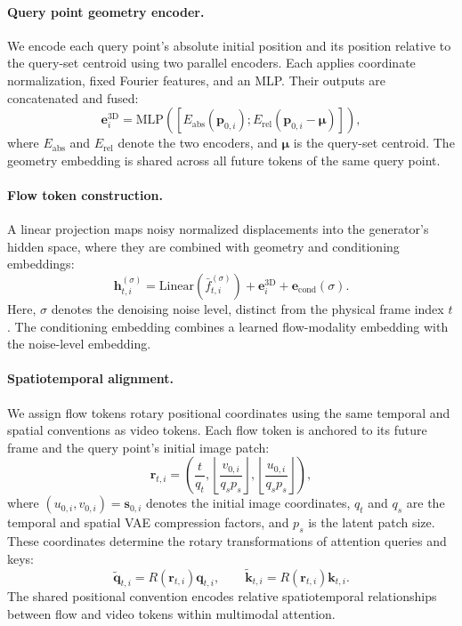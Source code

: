 \paragraph{Query point geometry encoder.}
We encode each query point's absolute initial position
and its position relative to the query-set centroid
using two parallel encoders.
Each applies coordinate normalization, fixed Fourier
features, and an MLP.
Their outputs are concatenated and fused:
\begin{equation}
\mathbf{e}^{\mathrm{3D}}_i
=
\mathrm{MLP}
\left(
\left[
E_{\mathrm{abs}}(\mathbf{p}_{0,i});
E_{\mathrm{rel}}(\mathbf{p}_{0,i}-\boldsymbol{\mu})
\right]
\right),
\label{eq:point-pe}
\end{equation}
where $E_{\mathrm{abs}}$ and $E_{\mathrm{rel}}$ denote
the two encoders, and $\boldsymbol{\mu}$ is the query-set
centroid.
The geometry embedding is shared across all future
tokens of the same query point.

\paragraph{Flow token construction.}
A linear projection maps noisy normalized displacements
into the generator's hidden space, where they are combined
with geometry and conditioning embeddings:
\begin{equation}
\mathbf{h}_{t,i}^{(\sigma)}
=
\mathrm{Linear}(\bar{f}_{t,i}^{(\sigma)})
+
\mathbf{e}^{\mathrm{3D}}_i
+
\mathbf{e}_{\mathrm{cond}}(\sigma).
\label{eq:flow-embedding}
\end{equation}
Here, $\sigma$ denotes the denoising noise level,
distinct from the physical frame index $t$.
The conditioning embedding combines a learned
flow-modality embedding with the noise-level embedding.

\paragraph{Spatiotemporal alignment.}
We assign flow tokens rotary positional coordinates
using the same temporal and spatial conventions as
video tokens.
Each flow token is anchored to its future frame
and the query point's initial image patch:
\begin{equation}
\mathbf{r}_{t,i}
=
\left(
\frac{t}{q_t},
\left\lfloor\frac{v_{0,i}}{q_s p_s}\right\rfloor,
\left\lfloor\frac{u_{0,i}}{q_s p_s}\right\rfloor
\right),
\label{eq:flow-rope-coordinates}
\end{equation}
where $(u_{0,i},v_{0,i})=\mathbf{s}_{0,i}$ denotes
the initial image coordinates, $q_t$ and $q_s$ are
the temporal and spatial VAE compression factors,
and $p_s$ is the latent patch size.
These coordinates determine the rotary transformations
of attention queries and keys:
\begin{equation}
\widetilde{\mathbf{q}}_{t,i}
=
R(\mathbf{r}_{t,i})\mathbf{q}_{t,i},
\qquad
\widetilde{\mathbf{k}}_{t,i}
=
R(\mathbf{r}_{t,i})\mathbf{k}_{t,i}.
\label{eq:flow-rope}
\end{equation}
The shared positional convention encodes relative
spatiotemporal relationships between flow and video
tokens within multimodal attention.

